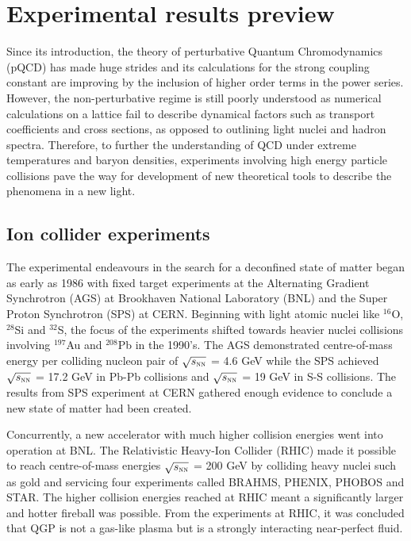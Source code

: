 \chapter{Experimental results preview}

Since its introduction, the theory of perturbative Quantum Chromodynamics (pQCD) has made huge strides and its calculations for the strong coupling constant
are improving by the inclusion of higher order terms in the power series. However, the non-perturbative regime is still poorly understood as numerical
calculations on a lattice fail to describe dynamical factors such as transport coefficients and cross sections, as opposed to outlining light nuclei
and hadron spectra. Therefore, to further the understanding of QCD under extreme temperatures and baryon densities, experiments involving high energy
particle collisions pave the way for development of new theoretical tools to describe the phenomena in a new light.

\section{Ion collider experiments}
The experimental endeavours in the search for a deconfined state of matter began as early as 1986 with fixed target experiments at the Alternating Gradient
Synchrotron (AGS) at Brookhaven National Laboratory (BNL) and the Super Proton Synchrotron (SPS) at CERN. Beginning with light atomic nuclei like $^{16}$O,
$^{28}$Si and $^{32}$S, the focus of the experiments shifted towards heavier nuclei collisions involving $^{197}$Au and $^{208}$Pb in the 1990's. The
AGS demonstrated centre-of-mass energy per colliding nucleon pair of $\sqrt{s_{\textnormal{\sc nn}}}$ = 4.6 GeV while the SPS achieved
$\sqrt{s_{\textnormal{\sc nn}}}$ = 17.2 GeV in Pb-Pb collisions\cite{MunzingerStachel:2007} and $\sqrt{s_{\textnormal{\sc nn}}}$ = 19 GeV in S-S
collisions\cite{Evans:1999}. The results from SPS experiment at CERN gathered enough evidence to conclude a new state of matter had been
created\cite{SPSqgp:2000, HeinzLHC:2000}.

Concurrently, a new accelerator with much higher collision energies went into operation at BNL. The Relativistic Heavy-Ion Collider (RHIC) made it possible
to reach centre-of-mass energies $\sqrt{s_{\textnormal{\sc nn}}}$ = 200 GeV by colliding heavy nuclei such as gold and servicing four experiments called
BRAHMS, PHENIX, PHOBOS and STAR. The higher collision energies reached at RHIC meant a significantly larger and hotter fireball was possible. From the
experiments at RHIC, it was concluded that QGP is not a gas-like plasma but is a strongly interacting near-perfect fluid\cite{Adams:2005}.

